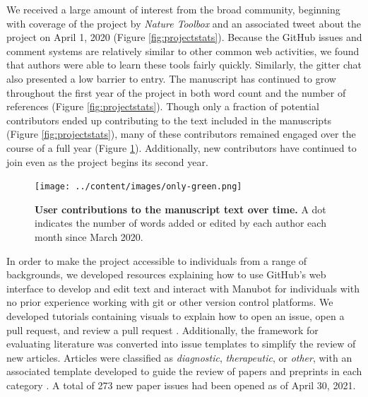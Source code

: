 \documentclass[sigconf]{acmart}
\begin{document}
We received a large amount of interest from the broad community, beginning with coverage of the project by \emph{Nature Toolbox} \citep{AE0QcVgJ} and an associated tweet about the project on April 1, 2020 \citep{Ygqb6P2w} (Figure \ref{fig:projectstats}).
Because the GitHub issues and comment systems are relatively similar to other common web activities, we found that authors were able to learn these tools fairly quickly.
Similarly, the gitter chat also presented a low barrier to entry.
The manuscript has continued to grow throughout the first year of the project in both word count and the number of references (Figure \ref{fig:projectstats}).
Though only a fraction of potential contributors ended up contributing to the text included in the manuscripts (Figure \ref{fig:projectstats}), many of these contributors remained engaged over the course of a full year (Figure \ref{fig:only-green}).
Additionally, new contributors have continued to join even as the project begins its second year.

\begin{figure}
\hypertarget{fig:only-green}{%
\centering
  \texttt{[image: ../content/images/only-green.png]}
  \caption{\textbf{User contributions to the manuscript text over time.}
  A dot indicates the number of words added or edited by each author each month since March 2020.
  }
  \label{fig:only-green}
}
\end{figure}

In order to make the project accessible to individuals from a range of backgrounds, we developed resources explaining how to use GitHub's web interface to develop and edit text and interact with Manubot for individuals with no prior experience working with git or other version control platforms.
We developed tutorials containing visuals to explain how to open an issue, open a pull request, and review a pull request \citep{cvGxPklV, R9PRcdKq}.
Additionally, the framework for evaluating literature was converted into issue templates to simplify the review of new articles.
Articles were classified as \emph{diagnostic}, \emph{therapeutic}, or \emph{other}, with an associated template developed to guide the review of papers and preprints in each category \citep{veonj9Vk}.
A total of 273 new paper issues had been opened as of April 30, 2021.
\end{document}
